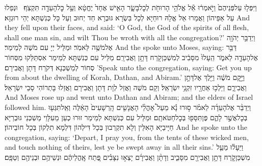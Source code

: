 {וַיִּפְּל֤וּ עַל\maqqaf פְּנֵיהֶם֙ וַיֹּ֣אמְר֔וּ אֵ֕ל אֱלֹהֵ֥י הָרוּחֹ֖ת לְכׇל\maqqaf בָּשָׂ֑ר הָאִ֤ישׁ אֶחָד֙ יֶחֱטָ֔א וְעַ֥ל כׇּל\maqqaf הָעֵדָ֖ה תִּקְצֹֽף׃ \setuma }
{וּנְפַלוּ עַל אַפֵּיהוֹן וַאֲמַרוּ אֵל אֱלָהּ רוּחַיָּא לְכָל בִּשְׂרָא גּוּבְרָא חַד יְחוּב וְעַל כָּל כְּנִשְׁתָּא יְהֵי רוּגְזָא׃}
{And they fell upon their faces, and said: ‘O God, the God of the spirits of all flesh, shall one man sin, and wilt Thou be wroth with all the congregation?’}{}
{וַיְדַבֵּ֥ר יְהֹוָ֖ה אֶל\maqqaf מֹשֶׁ֥ה לֵּאמֹֽר׃}
{וּמַלֵּיל יְיָ עִם מֹשֶׁה לְמֵימַר׃}
{And the \lord\space spoke unto Moses, saying:}{}
{דַּבֵּ֥ר אֶל\maqqaf הָעֵדָ֖ה לֵאמֹ֑ר הֵֽעָלוּ֙ מִסָּבִ֔יב לְמִשְׁכַּן\maqqaf קֹ֖רַח דָּתָ֥ן וַאֲבִירָֽם׃}
{מַלֵּיל עִם כְּנִשְׁתָּא לְמֵימַר אִסְתַּלַּקוּ מִסְּחוֹר סְחוֹר לְמַשְׁכְּנָא דְּקֹרַח דָּתָן וַאֲבִירָם׃}
{’Speak unto the congregation, saying: Get you up from about the dwelling of Korah, Dathan, and Abiram.’}{}
{וַיָּ֣קׇם מֹשֶׁ֔ה וַיֵּ֖לֶךְ אֶל\maqqaf דָּתָ֣ן וַאֲבִירָ֑ם וַיֵּלְכ֥וּ אַחֲרָ֖יו זִקְנֵ֥י יִשְׂרָאֵֽל׃}
{וְקָם מֹשֶׁה וַאֲזַל לְוָת דָּתָן וַאֲבִירָם וַאֲזַלוּ בָּתְרוֹהִי סָבֵי יִשְׂרָאֵל׃}
{And Moses rose up and went unto Dathan and Abiram; and the elders of Israel followed him.}{}
{וַיְדַבֵּ֨ר אֶל\maqqaf הָעֵדָ֜ה לֵאמֹ֗ר ס֣וּרוּ נָ֡א מֵעַל֩ אׇהֳלֵ֨י הָאֲנָשִׁ֤ים הָֽרְשָׁעִים֙ הָאֵ֔לֶּה וְאַֽל\maqqaf תִּגְּע֖וּ בְּכׇל\maqqaf אֲשֶׁ֣ר לָהֶ֑ם פֶּן\maqqaf תִּסָּפ֖וּ בְּכׇל\maqqaf חַטֹּאתָֽם׃}
{וּמַלֵּיל עִם כְּנִשְׁתָּא לְמֵימַר זוּרוּ כְעַן מֵעִלָּוֵי מַשְׁכְּנֵי גּוּבְרַיָּא חַיָּיבַיָּא הָאִלֵּין וְלָא תִקְרְבוּן בְּכָל דִּילְהוֹן דִּלְמָא תִלְקוֹן בְּכָל חוֹבֵיהוֹן׃}
{And he spoke unto the congregation, saying: ‘Depart, I pray you, from the tents of these wicked men, and touch nothing of theirs, lest ye be swept away in all their sins.’}{}
{וַיֵּעָל֗וּ מֵעַ֧ל מִשְׁכַּן\maqqaf קֹ֛רַח דָּתָ֥ן וַאֲבִירָ֖ם מִסָּבִ֑יב וְדָתָ֨ן וַאֲבִירָ֜ם יָצְא֣וּ נִצָּבִ֗ים פֶּ֚תַח אׇֽהֳלֵיהֶ֔ם וּנְשֵׁיהֶ֥ם וּבְנֵיהֶ֖ם וְטַפָּֽם׃}
